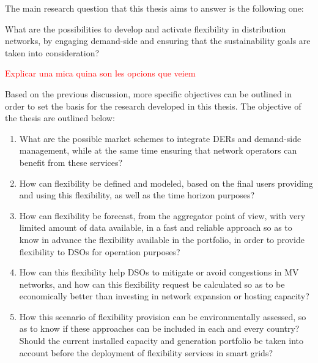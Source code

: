 The main research question that this thesis aims to answer is the following one:

\begin{tcolorbox}
What are the possibilities to develop and activate flexibility in distribution networks, by engaging demand-side and ensuring that the sustainability goals are taken into consideration? 
\end{tcolorbox}

\textcolor{red}{Explicar una mica quina son les opcions que veiem}

Based on the previous discussion, more specific objectives can be outlined in order to set the basis for the research developed in this thesis. The objective of the thesis are outlined below: 

\begin{tcolorbox}
\begin{enumerate}
\item What are the possible market schemes to integrate DERs and demand-side management, while at the same time ensuring that network operators can benefit from these services?  
\item How can flexibility be defined and modeled, based on the final users providing and using this flexibility, as well as the time horizon purposes? 
\item How can flexibility be forecast, from the aggregator point of view, with very limited amount of data available, in a fast and reliable approach so as to know in advance the flexibility available in the portfolio, in order to provide flexibility to DSOs for operation purposes?
\item How can this flexibility help DSOs to mitigate or avoid congestions in MV networks, and how can this flexibility request be calculated so as to be economically better than investing in network expansion or hosting capacity?
\item How this scenario of flexibility provision can be environmentally assessed, so as to know if these approaches can be included in each and every country? Should the current installed capacity and generation portfolio be taken into account before the deployment of flexibility services in smart grids?
\end{enumerate}
\end{tcolorbox}


